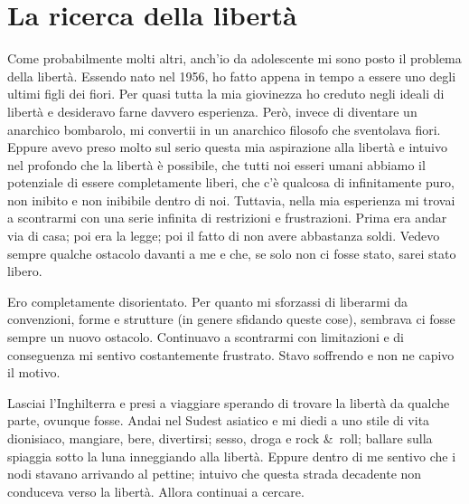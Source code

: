 \section*{La ricerca della libert\`a}

Come probabilmente molti altri, anch'io da adolescente mi sono posto il problema della libertà. Essendo nato nel 1956, ho fatto appena in tempo a essere uno degli ultimi figli dei fiori. Per quasi tutta la mia giovinezza ho creduto negli ideali di libertà e desideravo farne davvero esperienza. Però, invece di diventare un anarchico bombarolo, mi convertii in un anarchico filosofo che sventolava fiori. Eppure avevo preso molto sul serio questa mia aspirazione alla libertà e intuivo nel profondo che la libertà è possibile, che tutti noi esseri umani abbiamo il potenziale di essere completamente liberi, che c'è qualcosa di infinitamente puro, non inibito e non inibibile dentro di noi. Tuttavia, nella mia esperienza mi trovai a scontrarmi con una serie infinita di restrizioni e frustrazioni. Prima era andar via di casa; poi era la legge; poi il fatto di non avere abbastanza soldi. Vedevo sempre qualche ostacolo davanti a me e che, se solo non ci fosse stato, sarei stato libero.

Ero completamente disorientato. Per quanto mi sforzassi di liberarmi da convenzioni, forme e strutture (in genere sfidando queste cose), sembrava ci fosse sempre un nuovo ostacolo. Continuavo a scontrarmi con limitazioni e di conseguenza mi sentivo costantemente frustrato. Stavo soffrendo e non ne capivo il motivo.

Lasciai l'Inghilterra e presi a viaggiare sperando di trovare la libertà da qualche parte, ovunque fosse. Andai nel Sudest asiatico e mi diedi a uno stile di vita dionisiaco, mangiare, bere, divertirsi; sesso, droga e rock \&\ roll; ballare sulla spiaggia sotto la luna inneggiando alla libertà. Eppure dentro di me sentivo che i nodi stavano arrivando al pettine; intuivo che questa strada decadente non conduceva verso la libertà. Allora continuai a cercare.

